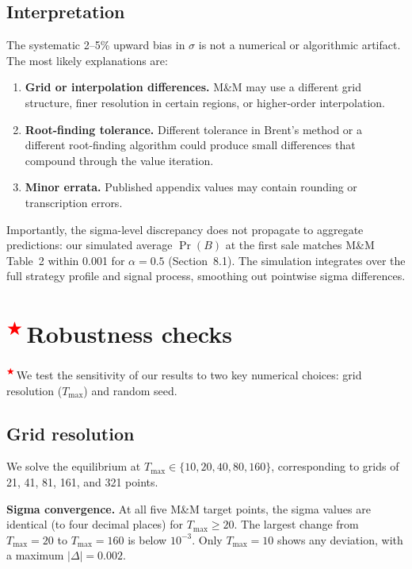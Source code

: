 \documentclass[11pt]{article}
\newcommand{\extension}{\textsuperscript{\textcolor{red}{$\bigstar$}}\,}
\begin{document}
\subsection{Interpretation}

The systematic 2--5\% upward bias in $\sigma$ is not a numerical or
algorithmic artifact. The most likely explanations are:

\begin{enumerate}
    \item \textbf{Grid or interpolation differences.} M\&M may use a
    different grid structure, finer resolution in certain regions, or
    higher-order interpolation.
    \item \textbf{Root-finding tolerance.} Different tolerance in Brent's
    method or a different root-finding algorithm could produce small
    differences that compound through the value iteration.
    \item \textbf{Minor errata.} Published appendix values may contain
    rounding or transcription errors.
\end{enumerate}

Importantly, the sigma-level discrepancy does not propagate to aggregate
predictions: our simulated average $\Pr(B)$ at the first sale matches
M\&M Table~2 within 0.001 for $\alpha = 0.5$ (Section~8.1). The simulation
integrates over the full strategy profile and signal process, smoothing out
pointwise sigma differences.

\section{\extension Robustness checks}\label{sec:robustness}

\extension We test the sensitivity of our results to two key numerical
choices: grid resolution ($T_{\max}$) and random seed.

\subsection{Grid resolution}

We solve the equilibrium at $T_{\max} \in \{10, 20, 40, 80, 160\}$,
corresponding to grids of 21, 41, 81, 161, and 321 points.

\textbf{Sigma convergence.} At all five M\&M target points, the sigma values
are identical (to four decimal places) for $T_{\max} \geq 20$. The largest
change from $T_{\max} = 20$ to $T_{\max} = 160$ is below $10^{-3}$. Only
$T_{\max} = 10$ shows any deviation, with a maximum $|\Delta| = 0.002$.
\end{document}
